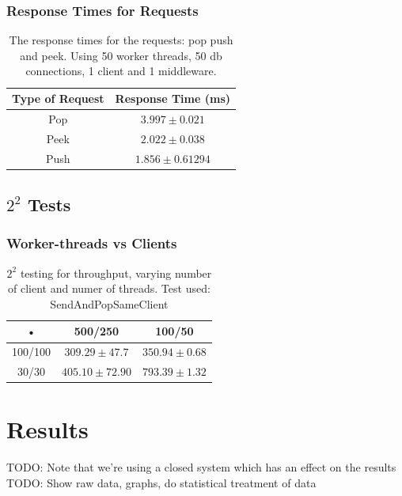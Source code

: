 \documentclass{article}
\begin{document}
            
        \subsubsection{Response Times for Requests}
            
                \begin{table}
            \begin{tabular}{|c|c|}
                \hline 
            \textbf{Type of Request} & \textbf{Response Time} (ms) \\ 
            \hline 
            Pop & $3.997 \pm 0.021$ \\ 
            \hline 
            Peek & $2.022 \pm 0.038$ \\ 
            \hline 
            Push & $1.856 \pm 0.61294$ \\ 
            \hline 
            \end{tabular} 
                \caption{The response times for the requests: pop push and peek. Using 50 worker threads, 50 db connections, 1 client and 1 middleware.}
                \label{tbl:response_times_requests}
                \end{table}
		\subsection{$2^2$ Tests}
		\subsubsection{Worker-threads vs Clients}
		\begin{table}
			\begin{tabular}{|c|c|c|}
			\hline 
			• & 500/250 & 100/50 \\ 
			\hline 
			100/100 & $309.29 \pm 47.7$ & $350.94 \pm 0.68$ \\ 
			\hline 
			30/30 & $405.10 \pm 72.90$ & $793.39 \pm 1.32$ \\ 
			\hline 
			\end{tabular} 
            \caption{$2^2$ testing for throughput, varying number of client and numer of threads. Test used: SendAndPopSameClient}
            \label{table:2k2-threads-clients}
            \end{table}

    \section{Results}
        TODO: Note that we're using a closed system which has an effect on the results\\
        TODO: Show raw data, graphs, do statistical treatment of data
            
\end{document}
